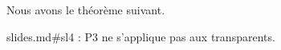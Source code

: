 Nous avons le théorème suivant.
\begin{theorem}
  slides.md#sl4 : P3 ne s'applique pas aux transparents.
\end{theorem}
